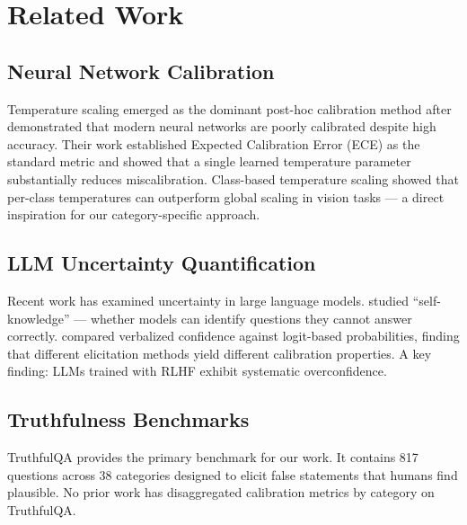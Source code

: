 \section{Related Work}

\subsection{Neural Network Calibration}

Temperature scaling emerged as the dominant post-hoc calibration method after \citet{guo2017calibration} demonstrated that modern neural networks are poorly calibrated despite high accuracy. Their work established Expected Calibration Error (ECE) as the standard metric and showed that a single learned temperature parameter substantially reduces miscalibration. Class-based temperature scaling \citep{frenkel2021class} showed that per-class temperatures can outperform global scaling in vision tasks --- a direct inspiration for our category-specific approach.

\subsection{LLM Uncertainty Quantification}

Recent work has examined uncertainty in large language models. \citet{kadavath2022language} studied ``self-knowledge'' --- whether models can identify questions they cannot answer correctly. \citet{xiong2023uncertainty} compared verbalized confidence against logit-based probabilities, finding that different elicitation methods yield different calibration properties. A key finding: LLMs trained with RLHF exhibit systematic overconfidence.

\subsection{Truthfulness Benchmarks}

TruthfulQA \citep{lin2022truthfulqa} provides the primary benchmark for our work. It contains 817 questions across 38 categories designed to elicit false statements that humans find plausible. No prior work has disaggregated calibration metrics by category on TruthfulQA.
